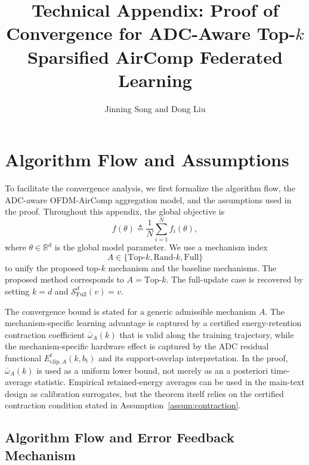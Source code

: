 \documentclass[conference]{IEEEtran}
\begin{document}
\title{Technical Appendix: Proof of Convergence for ADC-Aware Top-$k$ Sparsified AirComp Federated Learning}
\author{Jinning Song and Dong Liu}
\maketitle

\section{Algorithm Flow and Assumptions}

To facilitate the convergence analysis, we first formalize the algorithm flow, the ADC-aware OFDM-AirComp aggregation model, and the assumptions used in the proof. Throughout this appendix, the global objective is
\begin{equation}
    f(\theta) \triangleq \frac{1}{N}\sum_{i=1}^{N} f_i(\theta),
\end{equation}
where $\theta\in\mathbb{R}^d$ is the global model parameter. We use a mechanism index
\begin{equation}
    A\in\{\mathrm{Top}\text{-}k,\mathrm{Rand}\text{-}k,\mathrm{Full}\}
\end{equation}
to unify the proposed top-$k$ mechanism and the baseline mechanisms. The proposed method corresponds to $A=\mathrm{Top}\text{-}k$. The full-update case is recovered by setting $k=d$ and $\mathcal{S}_{\mathrm{Full}}^d(v)=v$.

The convergence bound is stated for a generic admissible mechanism $A$. The mechanism-specific learning advantage is captured by a certified energy-retention contraction coefficient $\bar{\omega}_A(k)$ that is valid along the training trajectory, while the mechanism-specific hardware effect is captured by the ADC residual functional $E_{\mathrm{clip},A}^t(k,b_t)$ and its support-overlap interpretation. In the proof, $\bar{\omega}_A(k)$ is used as a uniform lower bound, not merely as an a posteriori time-average statistic. Empirical retained-energy averages can be used in the main-text design as calibration surrogates, but the theorem itself relies on the certified contraction condition stated in Assumption~\ref{assum:contraction}.

\subsection{Algorithm Flow and Error Feedback Mechanism}
\end{document}
